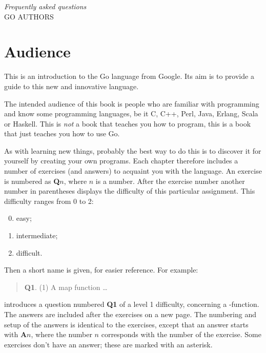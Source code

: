 {\textit{Frequently asked questions}\\ \textsc{GO AUTHORS}}

\section*{Audience}
\noindent{}This is an introduction to the Go language from Google. Its aim
is to provide a guide to this new and innovative language. 

The intended audience of this book is people who are familiar with programming
and know some programming languages, be it C\cite{c}, C++\cite{c++}, 
Perl\cite{perl}, Java\cite{java}, Erlang\cite{erlang}, Scala\cite{scala} or
Haskell\cite{haskell}. This is \emph{not} a book that teaches you how to 
program, this is a book that just teaches you how to use Go.

As with
learning new things, probably the best way to do this is to discover it for
yourself by creating your own programs.
Each chapter therefore includes a number of exercises (and answers)
to acquaint you with the language.
An exercise
is numbered as \textbf{Q$n$}, where $n$ is a number. After the
exercise number another number in parentheses displays the difficulty
of this particular assignment. This difficulty ranges from 0 to
2:
\begin{enumerate}
\setcounter{enumi}{-1}
\item easy;
\item intermediate;
\item difficult.
\end{enumerate}

Then a short name is given, for easier reference.
For example:
\begin{verse}
\textbf{Q1}. (1) A map function \ldots
\end{verse}
introduces a question numbered \textbf{Q1} of a level 1 difficulty, concerning a
-function. The answers are included after the exercises on a
new page.
The numbering and setup of the answers is identical to the
exercises, except that an answer starts with \textbf{A$n$}, where the
number $n$ corresponds with the number of the exercise. Some exercises
don't have an answer; these are marked with an asterisk.

